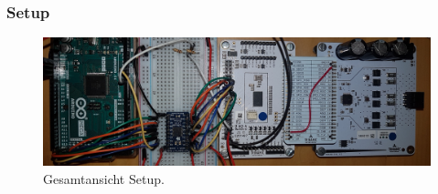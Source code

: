 \begin{appendix}
\subsubsection{Setup}\label{Appendix:TMC4671_Setup}

\begin{figure}[h!]
	\centering
	\includegraphics[angle=270,width=\textwidth]{graphics/2_komplett1}
	\caption{Gesamtansicht Setup.}
	\label{fig:2_komplett1}
\end{figure}


\end{appendix}
